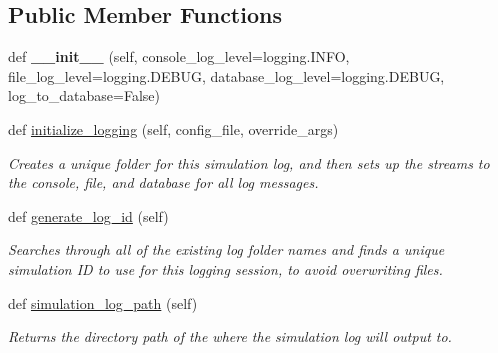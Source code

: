 \subsection*{Public Member Functions}
\begin{DoxyCompactItemize}
\item 
\mbox{\label{class_build_1_1_simulation___operation_1_1logger_1_1_simulation_logger_aa58accfe7d2e3c46e20a3ed805ada6d9}} 
def {\bfseries \+\_\+\+\_\+init\+\_\+\+\_\+} (self, console\+\_\+log\+\_\+level=logging.\+I\+N\+FO, file\+\_\+log\+\_\+level=logging.\+D\+E\+B\+UG, database\+\_\+log\+\_\+level=logging.\+D\+E\+B\+UG, log\+\_\+to\+\_\+database=False)
\item 
def \hyperlink{class_build_1_1_simulation___operation_1_1logger_1_1_simulation_logger_a4eeb0628ec65481e5c3c625c85723b80}{initialize\+\_\+logging} (self, config\+\_\+file, override\+\_\+args)
\begin{DoxyCompactList}\small\item\em Creates a unique folder for this simulation log, and then sets up the streams to the console, file, and database for all log messages. \end{DoxyCompactList}\item 
def \hyperlink{class_build_1_1_simulation___operation_1_1logger_1_1_simulation_logger_a596e3f475ff2a31b5ac647e47aa86b41}{generate\+\_\+log\+\_\+id} (self)
\begin{DoxyCompactList}\small\item\em Searches through all of the existing log folder names and finds a unique simulation ID to use for this logging session, to avoid overwriting files. \end{DoxyCompactList}\item 
\mbox{\label{class_build_1_1_simulation___operation_1_1logger_1_1_simulation_logger_ae1a333d5f65efb622ad579772ce46d64}} 
def \hyperlink{class_build_1_1_simulation___operation_1_1logger_1_1_simulation_logger_ae1a333d5f65efb622ad579772ce46d64}{simulation\+\_\+log\+\_\+path} (self)
\begin{DoxyCompactList}\small\item\em Returns the directory path of the where the simulation log will output to. \end{DoxyCompactList}\item 

\end{DoxyCompactItemize}
